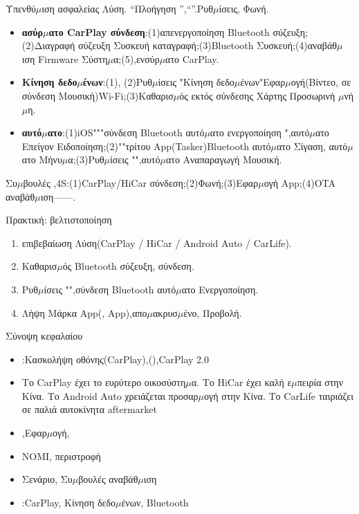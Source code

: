 \begin{tcbwarn}{Υπενθύ$\mu$ιση ασφαλείας}
Λύση. “Πλοήγηση ”,“”.Ρυθ$\mu$ίσεις, Φωνή.

\end{tcbwarn}


\begin{itemize}
  \item \textbf{ασύρ$\mu$ατο CarPlay σύνδεση}:(1)απενεργοποίηση Bluetooth σύζευξη;(2)Διαγραφή σύζευξη Συσκευή καταγραφή;(3)Bluetooth Συσκευή;(4)αναβάθ$\mu$ιση Firmware Σύστη$\mu$α;(5),ενσύρ$\mu$ατο CarPlay.
  \item \textbf{Κίνηση δεδο$\mu$ένων}:(1), (2)Ρυθ$\mu$ίσεις "Κίνηση δεδο$\mu$ένων"Εφαρ$\mu$ογή(Βίντεο, σε σύνδεση Μουσική)Wi-Fi;(3)Καθαρισ$\mu$ός εκτός σύνδεσης Χάρτης Προσωρινή $\mu$νή$\mu$η.
  \item \textbf{αυτό$\mu$ατο}:(1)iOS"""σύνδεση Bluetooth αυτό$\mu$ατο ενεργοποίηση ",αυτό$\mu$ατο Επείγον Ειδοποίηση;(2)""τρίτου App(Tasker)Bluetooth αυτό$\mu$ατο Σίγαση, αυτό$\mu$ατο Μήνυ$\mu$α;(3)Ρυθ$\mu$ίσεις "",αυτό$\mu$ατο Αναπαραγωγή Μουσική.
\end{itemize}

\begin{tcbinfo}{Συ$\mu$βουλές}
,4S:(1)CarPlay/HiCar σύνδεση;(2)Φωνή;(3)Εφαρ$\mu$ογή App;(4)OTA αναβάθ$\mu$ιση——.

\end{tcbinfo}

\begin{tcbpractice}{Πρακτική: βελτιστοποίηση}
\begin{enumerate}
  \item επιβεβαίωση Λύση(CarPlay / HiCar / Android Auto / CarLife).
  \item Καθαρισ$\mu$ός Bluetooth σύζευξη, σύνδεση.
  \item Ρυθ$\mu$ίσεις "",σύνδεση Bluetooth αυτό$\mu$ατο Ενεργοποίηση.
  \item Λήψη Μάρκα App(, App),απο$\mu$ακρυσ$\mu$ένο, Προβολή.
\end{enumerate}

\end{tcbpractice}

\begin{tcbsummary}{Σύνοψη κεφαλαίου}
\begin{itemize}
  \item :Κασκολήψη οθόνης(CarPlay),(),CarPlay 2.0
  \item Το CarPlay έχει το ευρύτερο οικοσύστη$\mu$α. Το HiCar έχει καλή ε$\mu$πειρία στην Κίνα. Το Android Auto χρειάζεται προσαρ$\mu$ογή στην Κίνα. Το CarLife ταιριάζει σε παλιά αυτοκίνητα aftermarket
  \item ,Εφαρ$\mu$ογή,
  \item NOMI, περιστροφή
  \item Σενάριο, Συ$\mu$βουλές αναβάθ$\mu$ιση
  \item :CarPlay, Κίνηση δεδο$\mu$ένων, Bluetooth
\end{itemize}

\end{tcbsummary}
